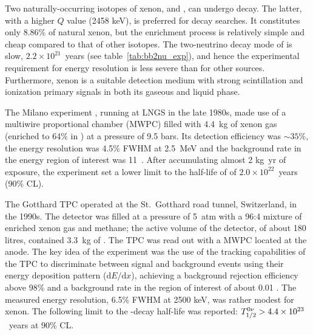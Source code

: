 Two naturally-occurring isotopes of xenon,  and , can undergo \bb decay. The latter, with a higher $Q$ value (2458 keV), is preferred for \bbonu decay searches. It constitutes only 8.86\% of natural xenon, but the enrichment process is relatively simple and cheap compared to that of other \bb isotopes. The two-neutrino decay mode of  is slow, $2.2\times10^{21}$~years (see table~\ref{tab:bb2nu_exp}), and hence the experimental requirement for energy resolution is less severe than for other \bb sources. Furthermore, xenon is a suitable detection medium with strong scintillation and ionization primary signals in both its gaseous and liquid phase.

The Milano experiment \cite{Zanotti:1991vh}, running at LNGS in the late 1980s, made use of a multiwire proportional chamber (MWPC) filled with 4.4~kg of xenon gas (enriched to 64\% in ) at a pressure of 9.5 bars. Its detection efficiency was $\sim35\%$, the energy resolution was 4.5\% FWHM at 2.5~MeV and the background rate in the energy region of interest was 11~\ckky. After accumulating almost 2 kg~yr of exposure, the experiment set a lower limit to the half-life of  of $2.0\times10^{22}$~years (90\% CL).

The Gotthard TPC \cite{Luscher:1998sd, Vuilleumier:1993zm} operated at the St.\ Gotthard road tunnel, Switzerland, in the 1990s. The detector was filled at a pressure of 5~atm with a 96:4 mixture of enriched xenon gas and methane; the active volume of the detector, of about 180 litres, contained 3.3~kg of . The TPC was read out with a MWPC located at the anode. The key idea of the experiment was the use of the tracking capabilities of the TPC to discriminate between signal and background events using their energy deposition pattern ($\mathrm{d}E/\mathrm{d}x$), achieving a background rejection efficiency above 98\% and a background rate in the region of interest of about 0.01 \ckkbby. The measured energy resolution, 6.5\% FWHM at 2500 keV, was rather modest for xenon. The following limit to the  \bbonu-decay half-life was reported: $T^{0\nu}_{1/2} > 4.4\times10^{23}$~years at 90\% CL. 

